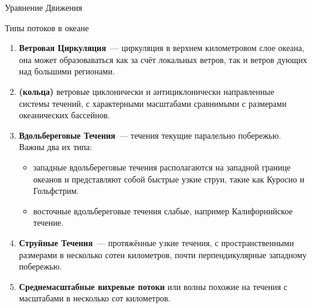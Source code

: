 \begin{chapter}{Уравнение Движения}
\begin{section}{Типы потоков в океане}
\begin{enumerate}
\item
\textbf{Ветровая Циркуляция}~--- циркуляция в верхнем километровом
слое океана, она может образоваваться как за счёт локальных ветров,
так и ветров дующих над большими регионами.
%

\item
\textbf{(кольца)} ветровые циклонически и антициклонически
направленные системы течений, с характерными масштабами сравнимыми с
размерами океанических бассейнов.
%

\item
\textbf{Вдольбереговые Течения}~--- течения текущие паралельно
побережью. Важны два их типа: 
%
%
\begin{itemize}
 \item западные вдольбереговые течения располагаются на западной
 границе океанов и представляют собой быстрые узкие струи, такие как
 Куросио и Гольфстрим.
%

 \item восточные вдольбереговые течения слабые, например Калифорнийское
 течение.
%
\end{itemize}

\item
\textbf{Струйные Течения}~--- протяжённые узкие течения, с
пространственными размерами в несколько сотен километров, почти
перпендикулярные западному побережью.
%

\item
\textbf{Среднемасштабные вихревые потоки} или волны похожие на течения
с масштабами в несколько сот километров.
%


\end{enumerate}
\end{section}
\end{chapter}
